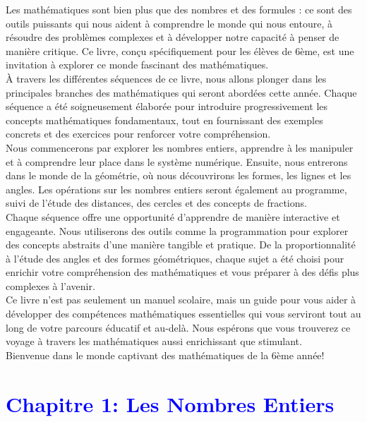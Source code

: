 \documentclass{article}
\begin{document}
Les mathématiques sont bien plus que des nombres et des formules : ce sont des outils puissants qui nous aident à comprendre le monde qui nous entoure, à résoudre des problèmes complexes et à développer notre capacité à penser de manière critique. Ce livre, conçu spécifiquement pour les élèves de 6ème, est une invitation à explorer ce monde fascinant des mathématiques.\\

À travers les différentes séquences de ce livre, nous allons plonger dans les principales branches des mathématiques qui seront abordées cette année. Chaque séquence a été soigneusement élaborée pour introduire progressivement les concepts mathématiques fondamentaux, tout en fournissant des exemples concrets et des exercices pour renforcer votre compréhension.\\

Nous commencerons par explorer les nombres entiers, apprendre à les manipuler et à comprendre leur place dans le système numérique. Ensuite, nous entrerons dans le monde de la géométrie, où nous découvrirons les formes, les lignes et les angles. Les opérations sur les nombres entiers seront également au programme, suivi de l'étude des distances, des cercles et des concepts de fractions.\\

Chaque séquence offre une opportunité d'apprendre de manière interactive et engageante. Nous utiliserons des outils comme la programmation pour explorer des concepts abstraits d'une manière tangible et pratique. De la proportionnalité à l'étude des angles et des formes géométriques, chaque sujet a été choisi pour enrichir votre compréhension des mathématiques et vous préparer à des défis plus complexes à l'avenir.\\

Ce livre n'est pas seulement un manuel scolaire, mais un guide pour vous aider à développer des compétences mathématiques essentielles qui vous serviront tout au long de votre parcours éducatif et au-delà. Nous espérons que vous trouverez ce voyage à travers les mathématiques aussi enrichissant que stimulant.\\

Bienvenue dans le monde captivant des mathématiques de la 6ème année!\\

\newpage

\section{\textcolor{blue}{Chapitre 1: Les Nombres Entiers}}
\end{document}
